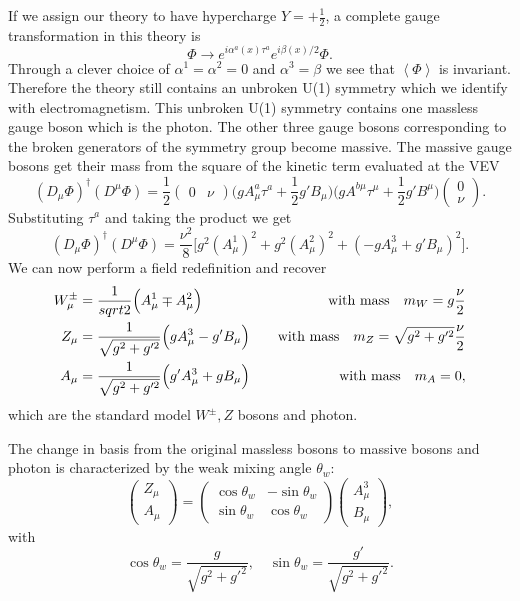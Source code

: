 If we assign our theory to have hypercharge $Y=+\frac{1}{2}$, a complete gauge transformation in this theory is
\begin{equation}
  \Phi\rightarrow e^{i\alpha^a(x)\tau^a}e^{i\beta(x)/2}\Phi.
\end{equation}
Through a clever choice of $\alpha^1=\alpha^2=0$ and $\alpha^3=\beta$ we see that $\left<\Phi\right>$ is invariant.
Therefore the theory still contains an unbroken U(1) symmetry which we identify with electromagnetism.
This unbroken U(1) symmetry contains one massless gauge boson which is the photon.
The other three gauge bosons corresponding to the broken generators of the symmetry group become massive.
The massive gauge bosons get their mass from the square of the kinetic term evaluated at the VEV
\begin{equation}
  (D_\mu\Phi)^\dagger(D^\mu\Phi)=\frac{1}{2}(\begin{matrix}0& \nu\end{matrix})\Big(gA^a_\mu\tau^a+\frac{1}{2}g'B_\mu\Big)\Big(gA^{b\mu}\tau^\mu+\frac{1}{2}g'B^\mu\Big)\left(\begin{matrix}0\\\nu\end{matrix}\right).
\end{equation}
Substituting $\tau^a$ and taking the product we get
\begin{equation}
  (D_\mu\Phi)^\dagger(D^\mu\Phi)=\frac{\nu^2}{8}\Big[g^2(A^1_\mu)^2+g^2(A^2_\mu)^2+(-gA^3_\mu+g'B_\mu)^2\Big].
\end{equation}
We can now perform a field redefinition and recover
\begin{align}
  W^\pm_\mu&=\frac{1}{sqrt{2}}\Big(A^1_\mu\mp A^2_\mu\Big)&\mbox{\quad with mass\quad} m_W=g\frac{\nu}{2}\\
  Z_\mu&=\frac{1}{\sqrt{g^2+g'^2}}\Big(gA^3_\mu-g'B_\mu\Big)&\mbox{\quad with mass\quad} m_Z=\sqrt{g^2+g'^2}\frac{\nu}{2}\\
  A_\mu&=\frac{1}{\sqrt{g^2+g'^2}}\Big(g'A^3_\mu+gB_\mu\Big)&\mbox{\quad with mass\quad} m_A=0,
\end{align}
which are the standard model $W^\pm, Z$ bosons and photon.

The change in basis from the original massless bosons to massive bosons and photon is characterized by the weak mixing angle $\theta_w$:
\begin{equation}
  \left(\begin{matrix}Z_\mu\\A_\mu\end{matrix}\right)=\left(\begin{matrix}\cos\theta_w & -\sin\theta_w\\\sin\theta_w & \cos\theta_w\end{matrix}\right)\left(\begin{matrix}A^3_\mu\\ B_\mu\end{matrix}\right),
\end{equation}
with
\begin{equation}
  \cos\theta_w=\frac{g}{\sqrt{g^2+g'^2}},\quad\sin\theta_w=\frac{g'}{\sqrt{g^2+g'^2}}.
\end{equation}

